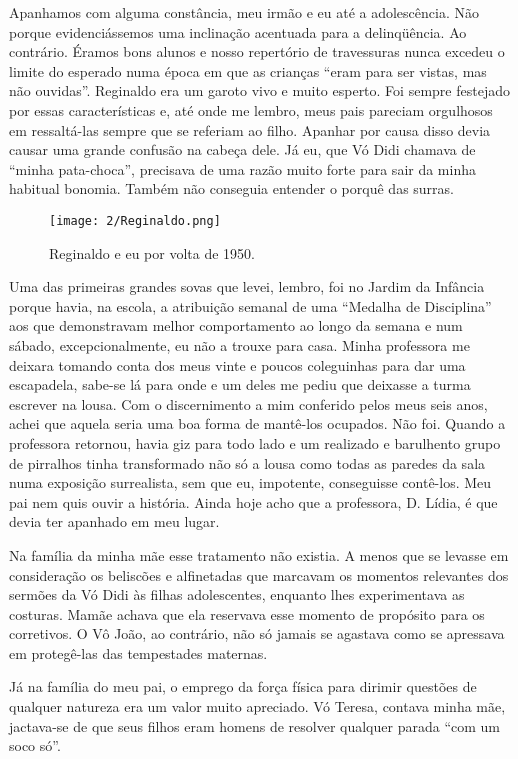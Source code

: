 Apanhamos com alguma constância, meu irmão e eu até a adolescência. 
Não porque evidenciássemos uma inclinação acentuada para a delinqüência. 
Ao contrário. 
Éramos bons alunos e nosso repertório de travessuras nunca excedeu o limite do esperado numa época em que as crianças “eram para ser vistas, mas não ouvidas”. 
Reginaldo era um garoto vivo e muito esperto. 
Foi sempre festejado por essas características e, até onde me lembro, meus pais pareciam orgulhosos em ressaltá-las sempre que se referiam ao filho. 
Apanhar por causa disso devia causar uma grande confusão na cabeça dele. Já eu, que Vó Didi chamava de “minha pata-choca”, precisava de uma razão muito forte para sair da minha habitual bonomia. 
Também não conseguia entender o porquê das surras.

\begin{figure}[H]
\centering
\texttt{[image: 2/Reginaldo.png]}
\caption{Reginaldo e eu por volta de 1950.}
\end{figure}

Uma das primeiras grandes sovas que levei, lembro, foi no Jardim da Infância porque havia, na escola, a atribuição semanal de uma “Medalha de Disciplina” aos que demonstravam melhor comportamento ao longo da semana e num sábado, excepcionalmente, eu não a trouxe para casa. 
Minha professora me deixara tomando conta dos meus vinte e poucos coleguinhas para dar uma escapadela, sabe-se lá para onde e um deles me pediu que deixasse a turma escrever na lousa. 
Com o discernimento a mim conferido pelos meus seis anos, achei que aquela seria uma boa forma de mantê-los ocupados. 
Não foi. 
Quando a professora retornou, havia giz para todo lado e um realizado e barulhento grupo de pirralhos tinha transformado não só a lousa como todas as paredes da sala numa exposição surrealista, sem que eu, impotente, conseguisse contê-los. 
Meu pai nem quis ouvir a história. 
Ainda hoje acho que a professora, D. Lídia, é que devia ter apanhado em meu lugar. 
 
Na família da minha mãe esse tratamento não existia. 
A menos que se levasse em consideração os beliscões e alfinetadas que marcavam os momentos relevantes dos sermões da Vó Didi às filhas adolescentes, enquanto lhes experimentava as costuras. 
Mamãe achava que ela reservava esse momento de propósito para os corretivos. O
Vô João, ao contrário, não só jamais se agastava como se apressava em protegê-las das tempestades maternas. 

Já na família do meu pai, o emprego da força física para dirimir questões de qualquer natureza era um valor muito apreciado. 
Vó Teresa, contava minha mãe, jactava-se de que seus filhos eram homens de resolver qualquer parada “com um soco só”. 


